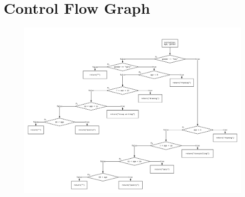 \documentclass[11pt, oneside]{article}   	%
\begin{document}
%
%
%
%
%
%
%

\section{Control Flow Graph}
\begin{figure}[!htb]
	\includegraphics[width=\linewidth]{control-flow.png}
\end{figure}
\newpage
\end{document}
